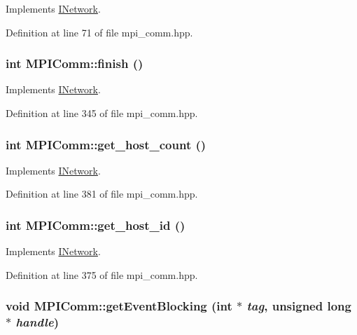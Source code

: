 Implements \hyperlink{class_i_network_a49a4daa697317d6fc065897a7926c26c}{INetwork}.

Definition at line 71 of file mpi\_\-comm.hpp.\hypertarget{class_m_p_i_comm_a96c71e22fbaac04771dffb5791e06692}{
\subsubsection[{finish}]{\setlength{\rightskip}{0pt plus 5cm}int MPIComm::finish ()}}
\label{class_m_p_i_comm_a96c71e22fbaac04771dffb5791e06692}


Implements \hyperlink{class_i_network_a667e56ba7f3713c949f84573ae710a85}{INetwork}.

Definition at line 345 of file mpi\_\-comm.hpp.\hypertarget{class_m_p_i_comm_a991f93012b8d83f7ca54fc780555c683}{
\subsubsection[{get\_\-host\_\-count}]{\setlength{\rightskip}{0pt plus 5cm}int MPIComm::get\_\-host\_\-count ()}}
\label{class_m_p_i_comm_a991f93012b8d83f7ca54fc780555c683}


Implements \hyperlink{class_i_network_a24bd475422706998cbee500825728d55}{INetwork}.

Definition at line 381 of file mpi\_\-comm.hpp.\hypertarget{class_m_p_i_comm_a856e93fd17d9e20104590440088b4049}{
\subsubsection[{get\_\-host\_\-id}]{\setlength{\rightskip}{0pt plus 5cm}int MPIComm::get\_\-host\_\-id ()}}
\label{class_m_p_i_comm_a856e93fd17d9e20104590440088b4049}


Implements \hyperlink{class_i_network_aef01bb260a8e60c7c9085b381cf86f13}{INetwork}.

Definition at line 375 of file mpi\_\-comm.hpp.\hypertarget{class_m_p_i_comm_a973e8bc1426f2ac24f86036909eb2407}{
\subsubsection[{getEventBlocking}]{\setlength{\rightskip}{0pt plus 5cm}void MPIComm::getEventBlocking (int $\ast$ {\em tag}, \/  unsigned long $\ast$ {\em handle})}}
\label{class_m_p_i_comm_a973e8bc1426f2ac24f86036909eb2407}


